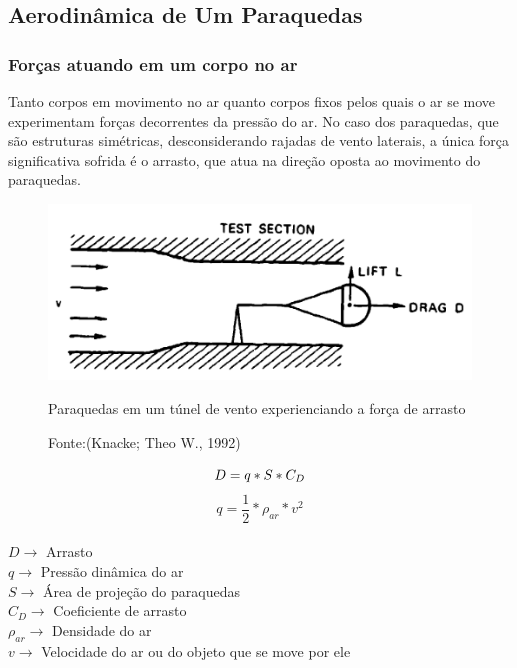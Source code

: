 \documentclass[a4paper, 12pt]{article}[abntex2]
\begin{document}
{            \subsection{Aerodinâmica de Um Paraquedas}
                \subsubsection{Forças atuando em um corpo no ar} 
                    Tanto corpos em movimento no ar quanto corpos fixos pelos quais o ar se move experimentam forças decorrentes da pressão do ar. No caso dos paraquedas, que são estruturas simétricas, desconsiderando rajadas de vento laterais, a única força significativa sofrida é o arrasto, que atua na direção oposta ao movimento do paraquedas.\cite{knacke92}
                    \\
                     \begin{figure}[h!]
                        \centering
                        \includegraphics[width = 0.5\linewidth]{figuras/image.png}
                        \caption{Paraquedas em um túnel de vento experienciando a força de arrasto}
                        \caption*{Fonte:(Knacke; Theo W., 1992) }
                        \label{fig: arrasto tunel de vento}
                    \end{figure}
                    \begin{equation}
                         D = q*S*C_D\\
                    \end{equation}
                    \begin{equation}
                        q = \frac{1}{2}*\rho_{ar}*v^2
                    \end{equation}
                    \\
                    $D \rightarrow$ Arrasto\\
                    $q \rightarrow$ Pressão dinâmica do ar\\
                    $S \rightarrow$ Área de projeção do paraquedas\\
                    $C_D \rightarrow$ Coeficiente de arrasto\\
                    $\rho_{ar} \rightarrow$ Densidade do ar\\
                    $v \rightarrow$ Velocidade do ar ou do objeto que se move por ele
}
\end{document}
